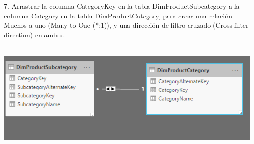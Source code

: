 \begin{flushleft}
\begin{itemize}
7. Arrastrar la columna CategoryKey en la tabla DimProductSubcategory a la columna Category en la tabla
DimProductCategory, para crear una relación Muchos a uno (Many to One (*:1)), y una dirección de filtro
cruzado (Cross filter
direction) en ambos.\\
\textbf{ }\\
\begin{center}
	\includegraphics[width=20cm]{./Imagenes/img25} 
	\end{center}
\textbf{ }\\


\end{itemize}
\end{flushleft}
